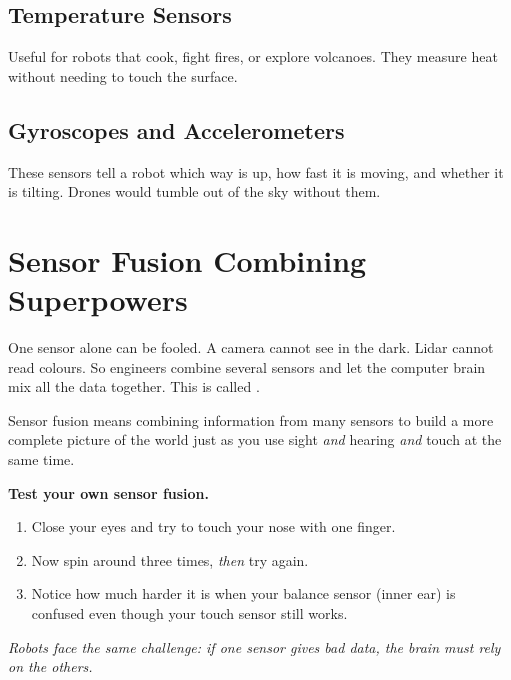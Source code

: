 \subsection*{Temperature Sensors}

Useful for robots that cook, fight fires, or explore volcanoes.
They measure heat without needing to touch the surface.

\subsection*{Gyroscopes and Accelerometers}

These sensors tell a robot which way is up, how fast it is moving,
and whether it is tilting. Drones would tumble out of the sky without them.


\sectionrule

\section*{Sensor Fusion \textemdash{} Combining Superpowers}

One sensor alone can be fooled. A camera cannot see in the dark. Lidar
cannot read colours. So engineers combine several sensors and let the
computer brain mix all the data together. This is called .

\begin{bigidea}
  Sensor fusion means combining information from many sensors
  to build a more complete picture of the world \textemdash{}
  just as you use sight \emph{and} hearing \emph{and} touch at the same time.
\end{bigidea}

\sectionrule

\begin{experiment}
  \textbf{Test your own sensor fusion.}
  \begin{enumerate}
    \item Close your eyes and try to touch your nose with one finger.
    \item Now spin around three times, \emph{then} try again.
    \item Notice how much harder it is when your balance sensor (inner ear)
      is confused \textemdash{} even though your touch sensor still works.
  \end{enumerate}
  \textit{Robots face the same challenge: if one sensor gives bad data,
  the brain must rely on the others.}
\end{experiment}

